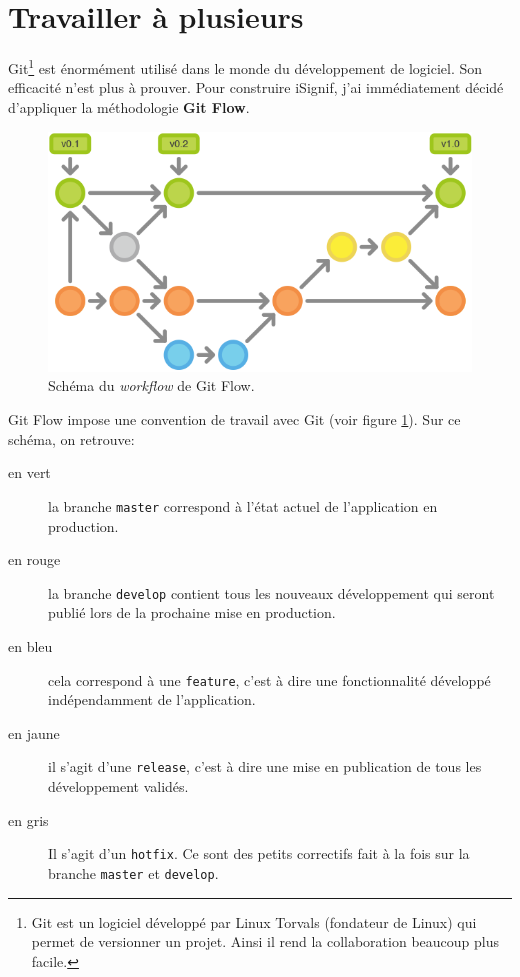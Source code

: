 \documentclass[]{report}
\begin{document}

  \section{Travailler à plusieurs}\label{sec:git}

    Git\footnote{Git est un logiciel développé par Linux Torvals (fondateur de Linux) qui permet de versionner un projet. Ainsi il rend la collaboration beaucoup plus facile.} est énormément utilisé dans le monde du développement de logiciel. Son efficacité n'est plus à prouver. Pour construire iSignif, j'ai immédiatement décidé d'appliquer la méthodologie \textbf{Git Flow}.

    \begin{figure}
      \includegraphics[width=\linewidth]{img/git-flow.png}
      \caption{Schéma du \textit{workflow} de Git Flow.}
      \label{fig:git-flow}
    \end{figure}

    Git Flow impose une convention de travail avec Git (voir figure \ref{fig:git-flow}). Sur ce schéma, on retrouve:

    \begin{description}
      \item[en vert] la branche \verb|master| correspond à l'état actuel de l'application en production.
      \item[en rouge] la branche \verb|develop| contient tous les nouveaux développement qui seront publié lors de la prochaine mise en production.
      \item[en bleu] cela correspond à une \verb|feature|, c'est à dire une fonctionnalité développé indépendamment de l'application.
      \item[en jaune] il s'agit d'une \verb|release|, c'est à dire une mise en publication de tous les développement validés.
      \item[en gris] Il s'agit d'un \verb|hotfix|. Ce sont des petits correctifs fait à la fois sur la branche \verb|master| et \verb|develop|.
    \end{description}
\end{document}
